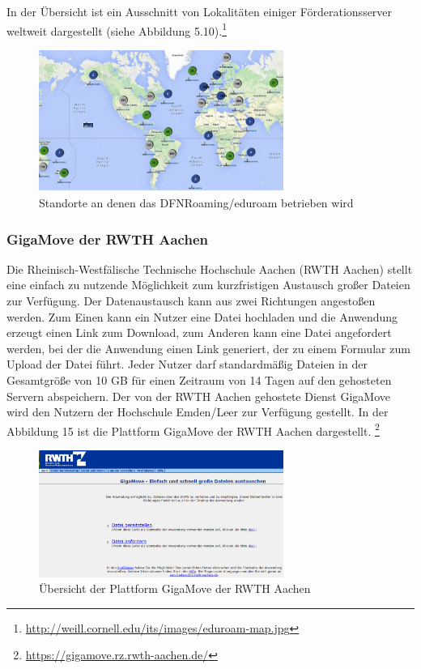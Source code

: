 In der Übersicht ist ein Ausschnitt von Lokalitäten einiger Förderationsserver weltweit dargestellt (siehe Abbildung 5.10).\footnote{\url{http://weill.cornell.edu/its/images/eduroam-map.jpg}}

\begin{figure}[h!]
	\centering
	\includegraphics[width=8cm]{kapitel/gruppe2/bilder/eduroam_map}
	\caption{Standorte an denen das DFNRoaming/eduroam betrieben wird}
	\label{fig_map_eduroam}
\end{figure}

\subsubsection{GigaMove der RWTH Aachen}
Die Rheinisch-Westfälische Technische Hochschule Aachen (RWTH Aachen) stellt eine einfach zu nutzende Möglichkeit zum kurzfristigen Austausch großer Dateien zur Verfügung. Der Datenaustausch kann aus zwei Richtungen angestoßen werden. Zum Einen kann ein Nutzer eine Datei hochladen und die Anwendung erzeugt einen Link zum Download, zum Anderen kann eine Datei angefordert werden, bei der die Anwendung einen Link generiert, der zu einem Formular zum Upload der Datei führt. Jeder Nutzer darf standardmäßig Dateien in der Gesamtgröße von 10 GB für einen Zeitraum von 14 Tagen auf den gehosteten Servern abspeichern. Der von der RWTH Aachen gehostete Dienst GigaMove wird den Nutzern der Hochschule Emden/Leer zur Verfügung gestellt. In der Abbildung 15 ist die Plattform GigaMove der RWTH Aachen dargestellt. \footnote{\url{https://gigamove.rz.rwth-aachen.de/}} 

\begin{figure}
	\centering
	\includegraphics[width=8cm]{kapitel/gruppe2/bilder/rwth_gigamove}
	\caption{Übersicht der Plattform GigaMove der RWTH Aachen}
	\label{fig_rwth_gigamove}
\end{figure}

